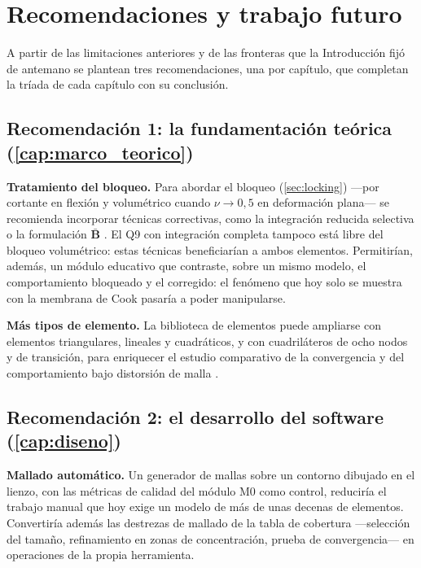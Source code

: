\section*{Recomendaciones y trabajo futuro}

A partir de las limitaciones anteriores y de las fronteras que la Introducción fijó de antemano se plantean tres recomendaciones, una por capítulo, que completan la tríada de cada capítulo con su conclusión.

\subsection*{Recomendación 1: la fundamentación teórica (\autoref{cap:marco_teorico})}

\textbf{Tratamiento del bloqueo.} Para abordar el bloqueo (\autoref{sec:locking}) —por cortante en flexión y volumétrico cuando $\nu \to 0{,}5$ en deformación plana— se recomienda incorporar técnicas correctivas, como la integración reducida selectiva o la formulación $\bar{\bm{B}}$ \autocites[pp.~221, 232-234]{hughes2000fem}[pp.~476-477]{bathe2014fem}. El Q9 con integración completa tampoco está libre del bloqueo volumétrico: estas técnicas beneficiarían a ambos elementos. Permitirían, además, un módulo educativo que contraste, sobre un mismo modelo, el comportamiento bloqueado y el corregido: el fenómeno que hoy solo se muestra con la membrana de Cook pasaría a poder manipularse.

\textbf{Más tipos de elemento.} La biblioteca de elementos puede ampliarse con elementos triangulares, lineales y cuadráticos, y con cuadriláteros de ocho nodos y de transición, para enriquecer el estudio comparativo de la convergencia y del comportamiento bajo distorsión de malla \autocites[pp.~167-174, 194]{onate2009structural}{reddy2006introduction}.

\subsection*{Recomendación 2: el desarrollo del software (\autoref{cap:diseno})}

\textbf{Mallado automático.} Un generador de mallas sobre un contorno dibujado en el lienzo, con las métricas de calidad del módulo M0 como control, reduciría el trabajo manual que hoy exige un modelo de más de unas decenas de elementos. Convertiría además las destrezas de mallado de la tabla de cobertura —selección del tamaño, refinamiento en zonas de concentración, prueba de convergencia— en operaciones de la propia herramienta.

